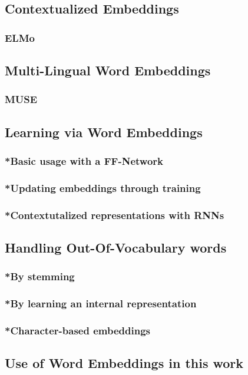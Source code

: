 \subsection{Contextualized Embeddings}
\subsubsection{ELMo}
\subsection{Multi-Lingual Word Embeddings}
\subsubsection{MUSE}
\subsection{Learning via Word Embeddings}
\subsubsection{*Basic usage with a FF-Network}
\subsubsection{*Updating embeddings through training}
\subsubsection{*Contextutalized representations with RNNs}
\subsection{Handling Out-Of-Vocabulary words}
\subsubsection{*By stemming}
\subsubsection{*By learning an internal representation}
\subsubsection{*Character-based embeddings}
\subsection{Use of Word Embeddings in this work}
\pagebreak


